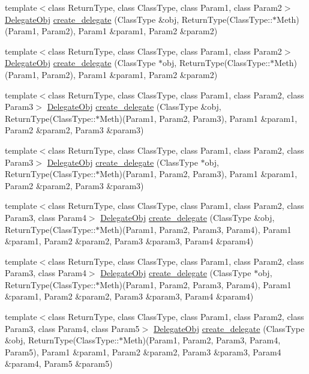 \begin{CompactItemize}
\item 
template$<$class Return\-Type, class Class\-Type, class Param1, class Param2$>$ \hyperlink{namespaceDL_a0}{Delegate\-Obj} \hyperlink{namespaceDL_a7}{create\_\-delegate} (Class\-Type \&obj, Return\-Type(Class\-Type::$\ast$Meth)(Param1, Param2), Param1 \&param1, Param2 \&param2)
\item 
template$<$class Return\-Type, class Class\-Type, class Param1, class Param2$>$ \hyperlink{namespaceDL_a0}{Delegate\-Obj} \hyperlink{namespaceDL_a8}{create\_\-delegate} (Class\-Type $\ast$obj, Return\-Type(Class\-Type::$\ast$Meth)(Param1, Param2), Param1 \&param1, Param2 \&param2)
\item 
template$<$class Return\-Type, class Class\-Type, class Param1, class Param2, class Param3$>$ \hyperlink{namespaceDL_a0}{Delegate\-Obj} \hyperlink{namespaceDL_a9}{create\_\-delegate} (Class\-Type \&obj, Return\-Type(Class\-Type::$\ast$Meth)(Param1, Param2, Param3), Param1 \&param1, Param2 \&param2, Param3 \&param3)
\item 
template$<$class Return\-Type, class Class\-Type, class Param1, class Param2, class Param3$>$ \hyperlink{namespaceDL_a0}{Delegate\-Obj} \hyperlink{namespaceDL_a10}{create\_\-delegate} (Class\-Type $\ast$obj, Return\-Type(Class\-Type::$\ast$Meth)(Param1, Param2, Param3), Param1 \&param1, Param2 \&param2, Param3 \&param3)
\item 
template$<$class Return\-Type, class Class\-Type, class Param1, class Param2, class Param3, class Param4$>$ \hyperlink{namespaceDL_a0}{Delegate\-Obj} \hyperlink{namespaceDL_a11}{create\_\-delegate} (Class\-Type \&obj, Return\-Type(Class\-Type::$\ast$Meth)(Param1, Param2, Param3, Param4), Param1 \&param1, Param2 \&param2, Param3 \&param3, Param4 \&param4)
\item 
template$<$class Return\-Type, class Class\-Type, class Param1, class Param2, class Param3, class Param4$>$ \hyperlink{namespaceDL_a0}{Delegate\-Obj} \hyperlink{namespaceDL_a12}{create\_\-delegate} (Class\-Type $\ast$obj, Return\-Type(Class\-Type::$\ast$Meth)(Param1, Param2, Param3, Param4), Param1 \&param1, Param2 \&param2, Param3 \&param3, Param4 \&param4)
\item 
template$<$class Return\-Type, class Class\-Type, class Param1, class Param2, class Param3, class Param4, class Param5$>$ \hyperlink{namespaceDL_a0}{Delegate\-Obj} \hyperlink{namespaceDL_a13}{create\_\-delegate} (Class\-Type \&obj, Return\-Type(Class\-Type::$\ast$Meth)(Param1, Param2, Param3, Param4, Param5), Param1 \&param1, Param2 \&param2, Param3 \&param3, Param4 \&param4, Param5 \&param5)

\end{CompactItemize}
